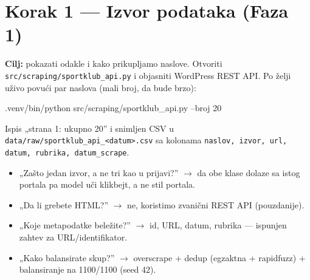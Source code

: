 \documentclass[11pt,a4paper]{article}
\newcommand{\kod}[1]{\texttt{#1}}
\begin{document}
\section{Korak 1 --- Izvor podataka (Faza 1)}
\textbf{Cilj:} pokazati odakle i kako prikupljamo naslove. Otvoriti
\kod{src/scraping/sportklub\_api.py} i objasniti WordPress REST API. Po želji uživo
povući par naslova (mali broj, da bude brzo):
\begin{cmd}
.venv/bin/python src/scraping/sportklub_api.py --broj 20
\end{cmd}
\begin{izlaz}
Ispis „strana 1: ukupno 20'' i snimljen CSV u \kod{data/raw/sportklub\_api\_<datum>.csv}
sa kolonama \kod{naslov, izvor, url, datum, rubrika, datum\_scrape}.
\end{izlaz}
\begin{pita}
\begin{itemize}[nosep]
  \item „Zašto jedan izvor, a ne tri kao u prijavi?'' $\to$ da obe klase dolaze sa
    istog portala pa model uči klikbejt, a ne stil portala.
  \item „Da li grebete HTML?'' $\to$ ne, koristimo zvanični REST API (pouzdanije).
  \item „Koje metapodatke beležite?'' $\to$ id, URL, datum, rubrika --- ispunjen
    zahtev za URL/identifikator.
  \item „Kako balansirate skup?'' $\to$ overscrape + dedup (egzaktna + rapidfuzz) +
    balansiranje na 1100/1100 (seed 42).
\end{itemize}
\end{pita}

\end{document}
